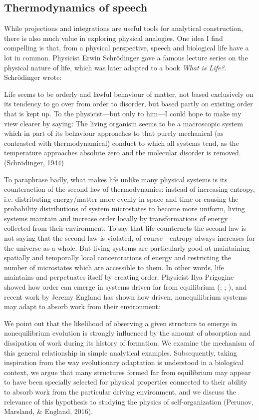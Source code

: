 \subsection{Thermodynamics of speech}

While projections and integrations are useful tools for analytical construction, there is also much value in exploring physical analogies. One idea I find compelling is that, from a physical perspective, speech and biological life have a lot in common. Physicist Erwin Schrödinger gave a famous lecture series on the physical nature of life, which was later adapted to a book \textit{What is Life?}. Schrödinger wrote:

Life seems to be orderly and lawful behaviour of matter, not based exclusively on its tendency to go over from order to disorder, but based partly on existing order that is kept up. To the physicist—but only to him—I could hope to make my view clearer by saying: The living organism seems to be a macroscopic system which in part of its behaviour approaches to that purely mechanical (as contrasted with thermodynamical) conduct to which all systems tend, as the temperature approaches absolute zero and the molecular disorder is removed. (Schrödinger, 1944)

  To paraphrase badly, what makes life unlike many physical systems is its counteraction of the second law of thermodynamics: instead of increasing entropy, i.e. distributing energy/matter more evenly in space and time or causing the probability distributions of system microstates to become more uniform, living systems maintain and increase order locally by transformations of energy collected from their environment. To say that life counteracts the second law is not saying that the second law is violated, of course—entropy always increases for the universe as a whole. But living systems are particularly good at maintaining spatially and temporally local concentrations of energy and restricting the number of microstates which are accessible to them. In other words, life maintains and perpetuates itself by creating order. Physicist Ilya Prigogine showed how order can emerge in systems driven far from equilibrium (\citealt{KondepudiPrigogine1998}; \citealt{NicolisPrigogine1977}; \citealt{PrigogineStengers1984}), and recent work by Jeremy England has shown how driven, nonequilibrium systems may adapt to absorb work from their environment:

We point out that the likelihood of observing a given structure to emerge in nonequilibrium evolution is strongly influenced by the amount of absorption and dissipation of work during its history of formation. We examine the mechanism of this general relationship in simple analytical examples. Subsequently, taking inspiration from the way evolutionary adaptation is understood in a biological context, we argue that many structures formed far from equilibrium may appear to have been specially selected for physical properties connected to their ability to absorb work from the particular driving environment, and we discuss the relevance of this hypothesis to studying the physics of self-organization (Perunov, Marsland, \& England, 2016).

